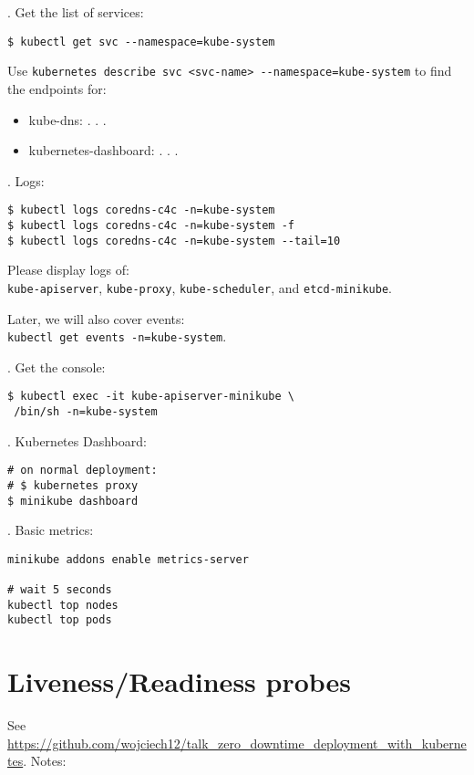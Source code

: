 \documentclass[12pt, letterpaper]{article}
\begin{document}
. Get the list of services:

\begin{verbatim}
$ kubectl get svc --namespace=kube-system
\end{verbatim}

Use \verb|kubernetes describe svc <svc-name> --namespace=kube-system| to find the endpoints for:
\begin{itemize}
\item kube-dns: . . .
\item kubernetes-dashboard: . . .
\end{itemize}

. Logs:

\begin{verbatim}
$ kubectl logs coredns-c4c -n=kube-system
$ kubectl logs coredns-c4c -n=kube-system -f
$ kubectl logs coredns-c4c -n=kube-system --tail=10
\end{verbatim}

Please display logs of:\\
\verb|kube-apiserver|, \verb|kube-proxy|, \verb|kube-scheduler|, and \verb|etcd-minikube|.


Later, we will also cover events:\\
\texttt{kubectl get events -n=kube-system}.

. Get the console:

\begin{verbatim}
$ kubectl exec -it kube-apiserver-minikube \
 /bin/sh -n=kube-system
\end{verbatim}

. Kubernetes Dashboard:

\begin{verbatim}
# on normal deployment:
# $ kubernetes proxy
$ minikube dashboard
\end{verbatim}

. Basic metrics:

\begin{verbatim}
minikube addons enable metrics-server

# wait 5 seconds
kubectl top nodes
kubectl top pods
\end{verbatim}

%
\section{Liveness/Readiness probes}
See \href{https://github.com/wojciech12/talk_zero_downtime_deployment_with_kubernetes}{https://github.com/wojciech12/talk\_zero\_downtime\_deployment\_with\_kubernetes}. Notes:
\bigskip
\bigskip
\bigskip
\end{document}
